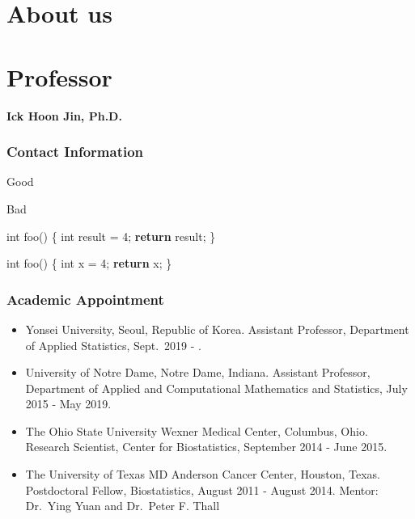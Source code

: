 \documentclass[
]{book}
\author{}
\date{\vspace{-2.5em}}
\newenvironment{Shaded}{\begin{snugshade}}{\end{snugshade}}
\newcommand{\ControlFlowTok}[1]{\textcolor[rgb]{0.13,0.29,0.53}{\textbf{#1}}}
\newcommand{\DataTypeTok}[1]{\textcolor[rgb]{0.13,0.29,0.53}{#1}}
\newcommand{\DecValTok}[1]{\textcolor[rgb]{0.00,0.00,0.81}{#1}}
\newcommand{\NormalTok}[1]{#1}
\begin{document}
{
\setcounter{tocdepth}{1}
\tableofcontents
}
\hypertarget{about-us}{%
\chapter*{About us}\label{about-us}}

\hypertarget{professor}{%
\chapter*{Professor}\label{professor}}

\textbf{Ick Hoon Jin, Ph.D.}

\hypertarget{contact-information}{%
\subsection*{Contact Information}\label{contact-information}}

Good

Bad

\begin{Shaded}
\begin{Highlighting}[]
\DataTypeTok{int}\NormalTok{ foo() \{}
    \DataTypeTok{int}\NormalTok{ result = }\DecValTok{4}\NormalTok{;}
    \ControlFlowTok{return}\NormalTok{ result;}
\NormalTok{\}}
\end{Highlighting}
\end{Shaded}

\begin{Shaded}
\begin{Highlighting}[]
\DataTypeTok{int}\NormalTok{ foo() \{ }
    \DataTypeTok{int}\NormalTok{ x = }\DecValTok{4}\NormalTok{;}
    \ControlFlowTok{return}\NormalTok{ x;}
\NormalTok{\}}
\end{Highlighting}
\end{Shaded}

\hypertarget{academic-appointment}{%
\subsection*{Academic Appointment}\label{academic-appointment}}

\begin{itemize}
\item
  Yonsei University, Seoul, Republic of Korea.
  Assistant Professor, Department of Applied Statistics, Sept.~2019 - .
\item
  University of Notre Dame, Notre Dame, Indiana.
  Assistant Professor, Department of Applied and Computational Mathematics and Statistics, July 2015 - May 2019.
\item
  The Ohio State University Wexner Medical Center, Columbus, Ohio.
  Research Scientist, Center for Biostatistics, September 2014 - June 2015.
\item
  The University of Texas MD Anderson Cancer Center, Houston, Texas.
  Postdoctoral Fellow, Biostatistics, August 2011 - August 2014.
  Mentor: Dr.~Ying Yuan and Dr.~Peter F. Thall
\end{itemize}
\end{document}
